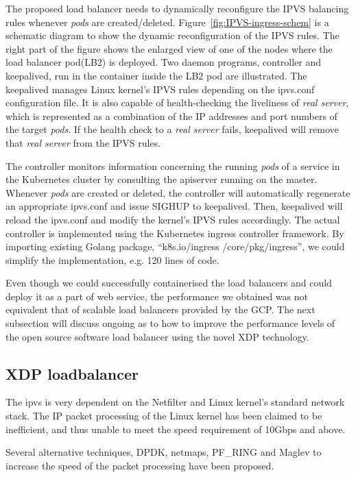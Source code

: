 The proposed load balancer needs to dynamically reconfigure the IPVS balancing rules whenever {\em pods} are created/deleted. 
Figure~\ref{fig:IPVS-ingress-schem} is a schematic diagram to show the dynamic reconfiguration of the IPVS rules.
The right part of the figure shows the enlarged view of one of the nodes where the load balancer pod(LB2) is deployed.
Two daemon programs, controller and keepalived, run in the container inside the LB2 pod are illustrated.
The keepalived manages Linux kernel's IPVS rules depending on the ipvs.conf configuration file.
It is also capable of health-checking the liveliness of {\em real server}, 
which is represented as a combination of the IP addresses and port numbers of the target {\em pods}. 
If the health check to a {\em real server} fails, keepalived will remove that {\em real server} from the IPVS rules.

The controller monitors information concerning the running {\em pods} of a service 
in the Kubernetes cluster by consulting the apiserver running on the master.
Whenever {\em pods} are created or deleted, the controller will automatically regenerate an appropriate ipvs.conf 
and issue SIGHUP to keepalived.
Then, keepalived will reload the ipvs.conf and modify the kernel's IPVS rules accordingly.
The actual controller\cite{ktaka_ccmp_2017_826894} is implemented using the Kubernetes ingress controller\cite{K8sIngress2017} framework. 
By importing existing Golang package, \enquote{k8s.io/ingress /core/pkg/ingress}, we could simplify the implementation, e.g. 
120 lines of code.  

Even though we could successfully containerised the load balancers and could deploy it as a part of web service,
the performance we obtained was not equivalent that of scalable load balancers provided by the GCP.
The next subsection will discuss ongoing as to how to improve the performance levels of the open source software load balancer using the novel XDP technology.

\subsection{XDP loadbalancer}\label{XDP loadbalancer}

The ipvs is very dependent on the Netfilter and Linux kernel's standard network stack.
The IP packet processing of the Linux kernel has been claimed to be inefficient, and thus unable to meet the speed requirement of 10Gbps and above.

Several alternative techniques, DPDK\cite{dpdkorg}, netmaps\cite{rizzo2012netmap}, PF\_RING\cite{deri2004improving} and Maglev\cite{eisenbud2016maglev} to increase the speed of the packet processing have been proposed.

